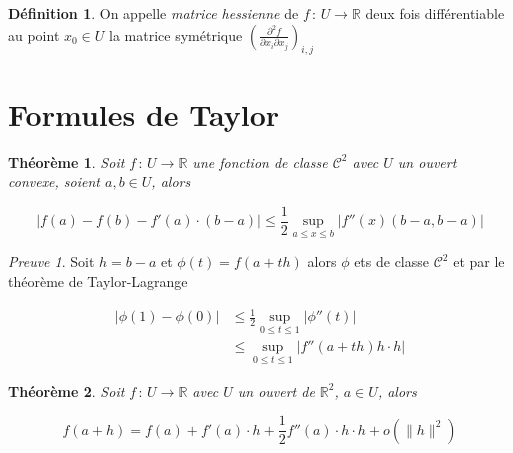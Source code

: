\documentclass[]{article}
\newtheorem{mythm}{Théorème}
\theoremstyle{remark}
\newtheorem{myproof}{Preuve}
\theoremstyle{definition}
\newtheorem{mydef}{Définition}
\newcommand{\funcshort}[3]{
#1 \, : \, #2 \longrightarrow #3
}
\begin{document}
\begin{mydef}
	On appelle \textit{matrice hessienne} de $\funcshort{f}{U}{\mathbb{R}}$ deux fois différentiable au point $x_0 \in U$ la matrice symétrique $\displaystyle \left(\frac{\partial^2 f}{\partial x_i \partial x_j}\right)_{i, j}$
\end{mydef}

\section{Formules de Taylor}

\begin{mythm}
	Soit $\funcshort{f}{U}{\mathbb{R}}$ une fonction de classe $\mathcal{C}^2$ avec $U$ un ouvert convexe, soient $a, b \in U$, alors
	
	$$|f(a) - f(b) - f'(a) \cdot (b-a)| \leqslant \frac{1}{2} \sup_{a \leqslant x \leqslant b} |f''(x) (b - a, b-a)|$$
\end{mythm}

\begin{myproof}
	Soit $h = b - a$ et $\phi(t) = f(a+th)$ alors $\phi$ ets de classe $\mathcal{C}^2$ et par le théorème de Taylor-Lagrange
	
	$$\begin{aligned}
	|\phi(1) - \phi(0)| &\leqslant \frac{1}{2} \sup_{0 \leqslant t \leqslant 1} |\phi''(t)| \\
	&\leqslant \sup_{0 \leqslant t \leqslant 1} |f''(a+th)h \cdot h|
	\end{aligned}$$
\end{myproof}

\begin{mythm}
	Soit $\funcshort{f}{U}{\mathbb{R}}$ avec $U$ un ouvert de $\mathbb{R}^2$, $a \in U$, alors
	
	$$f(a+h) = f(a) + f'(a) \cdot h + \frac{1}{2} f''(a) \cdot h \cdot h + o(\|h\|^2)$$
\end{mythm}
\end{document}
